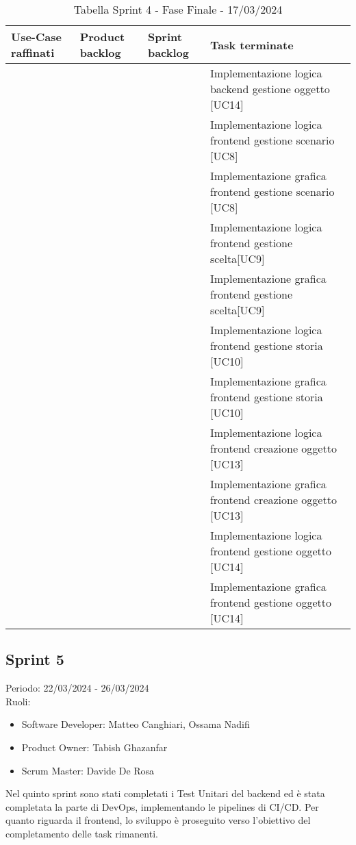 \documentclass{article}
\begin{document}
\begin{table}[h]
    \centering
    \begin{tabularx}{\textwidth}{|X|X|X|X|}
        \hline
        \bf Use-Case raffinati & \bf Product backlog & \bf Sprint backlog & \bf Task terminate \\
        \hline
        & & & Implementazione logica backend gestione oggetto [UC14] \\
        \hline
        & & & Implementazione logica frontend gestione scenario [UC8] \\
        \hline
        & & & Implementazione grafica frontend gestione scenario [UC8] \\
        \hline
        & & & Implementazione logica frontend gestione scelta[UC9] \\
        \hline
        & & & Implementazione grafica frontend gestione scelta[UC9] \\
        \hline
        & & & Implementazione logica frontend gestione storia [UC10] \\
        \hline
        & & & Implementazione grafica frontend gestione storia [UC10] \\
        \hline
        & & & Implementazione logica frontend creazione oggetto [UC13] \\
        \hline
        & & & Implementazione grafica frontend creazione oggetto [UC13] \\
        \hline
        & & & Implementazione logica frontend gestione oggetto [UC14] \\
        \hline
        & & & Implementazione grafica frontend gestione oggetto [UC14] \\
        \hline
    \end{tabularx}
    \caption*{Tabella Sprint 4 - Fase Finale - 17/03/2024}
\end{table}

\clearpage
\subsection{Sprint 5}
Periodo: 22/03/2024 - 26/03/2024\vspace*{7pt}\\
Ruoli:
\begin{itemize}[label = { }]
    \itemsep0em
    \item Software Developer: Matteo Canghiari, Ossama Nadifi 
    \item Product Owner: Tabish Ghazanfar
    \item Scrum Master: Davide De Rosa
\end{itemize}
Nel quinto sprint sono stati completati i Test Unitari del backend ed è stata completata la parte di DevOps, implementando le pipelines di CI/CD. Per quanto riguarda il frontend, lo sviluppo è proseguito verso l'obiettivo del completamento delle task rimanenti.
\end{document}
